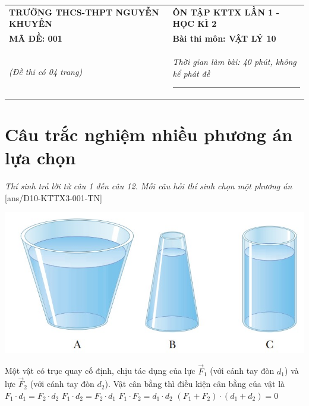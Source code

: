 \begin{center}
	\begin{tabular}{M{9.25cm}M{8.75cm}}
		\textbf{TRƯỜNG THCS-THPT NGUYỄN KHUYẾN}& \textbf{ÔN TẬP KTTX LẦN 1 - HỌC KÌ 2}\\
		\textbf{MÃ ĐỀ: 001}& \textbf{Bài thi môn: VẬT LÝ 10}\\
		\textit{(Đề thi có 04 trang)}& \textit{Thời gian làm bài: 40 phút, không kể phát đề}
		
		\noindent\rule{4cm}{0.8pt} \\
	\end{tabular}
\end{center}
\vspace{-0.5cm}
\setcounter{section}{0}
\section{Câu trắc nghiệm nhiều phương án lựa chọn}
\textit{Thí sinh trả lời từ câu 1 đến câu 12. Mỗi câu hỏi thí sinh chọn một phương án}
\setcounter{ex}{0}
[ans/D10-KTTX3-001-TN]
\begin{ex}
{\includegraphics[scale=0.6]{../figs/D10-KTTX3-001-2}}
	\loigiai{}
\end{ex}
\begin{ex}
	Một vật có trục quay cố định, chịu tác dụng của lực $\vec{F}_1$ (với cánh tay đòn $d_1$) và lực $\vec{F}_2$ (với cánh tay đòn $d_2$). Vật cân bằng thì điều kiện cân bằng của vật là
	\choice
	{\True $F_1\cdot d_1=F_2\cdot d_2$}
	{$F_1\cdot d_2=F_2\cdot d_1$}
	{$F_1\cdot F_2=d_1\cdot d_2$}
	{$\left(F_1+F_2\right)\cdot\left(d_1+d_2\right)=0$}
	\loigiai{}
\end{ex}
